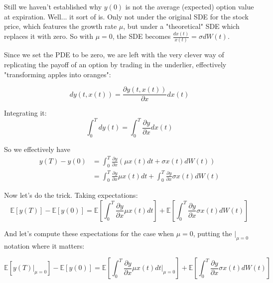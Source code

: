\documentclass{article}
\begin{document}
Still we haven't established why $y(0)$ is not the average (expected) option value at expiration. Well... it sort of is. Only not under the original SDE for the stock price, which features the growth rate $\mu$, but under a "theoretical" SDE which replaces it with zero. So with $\mu = 0$, the SDE becomes $\frac{dx(t)}{x(t)} = \sigma dW(t)$.

Since we set the PDE to be zero, we are left with the very clever way of replicating the payoff of an option by trading in the underlier, effectively "transforming apples into oranges":

\begin{equation}
    dy(t, x(t)) = \frac{\partial y(t, x(t))}{\partial x} dx(t)
\end{equation}

Integrating it:
\begin{equation}
    \int_{0}^{T} d y(t) = \int_{0}^{T} \frac{\partial y}{\partial x} dx(t)
\end{equation}

So we effectively have
\begin{equation}
  \begin{aligned}
    y(T) - y(0) & = \int_{0}^{T} \frac{\partial y}{\partial x} \left( \mu x(t) dt + \sigma x(t) dW(t) \right) \\
                & = \int_{0}^{T} \frac{\partial y}{\partial x} \mu x(t) dt + \int_{0}^{T} \frac{\partial y}{\partial x} \sigma x(t) dW(t)
  \end{aligned}
\end{equation}

Now let's do the trick. Taking expectations:
\begin{equation}
    \mathbb{E}[y(T)] - \mathbb{E}[y(0)] = \mathbb{E} \left[ \int_{0}^{T} \frac{\partial y}{\partial x} \mu x(t) dt \right] + \mathbb{E} \left[ \int_{0}^{T} \frac{\partial y}{\partial x} \sigma x(t) dW(t) \right]
\end{equation}

And let's compute these expectations for the case when $\mu = 0$, putting the $\Big|_{\mu=0}^{}$ notation where it matters:

\begin{equation}
    \mathbb{E}[y(T)\Big|_{\mu=0}^{}] - \mathbb{E}[y(0)] = \mathbb{E} \left[ \int_{0}^{T} \frac{\partial y}{\partial x} \mu x(t) dt \Big|_{\mu=0}^{} \right] + \mathbb{E} \left[ \int_{0}^{T} \frac{\partial y}{\partial x} \sigma x(t) dW(t) \right]
\end{equation}
\end{document}
